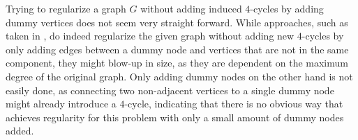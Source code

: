 \documentclass[a4paper,UKenglish,cleveref, autoref, thm-restate,numberwithinsect]{lipics-v2021}
\begin{document}
Trying to regularize a graph $G$ without adding induced $4$-cycles by adding dummy vertices does not seem very straight forward.
While approaches, such as taken in \cite{Cai08}, do indeed regularize the given graph without adding new $4$-cycles by only adding edges between a dummy node and vertices that are not in the same component,
they might blow-up in size, as they are dependent on the maximum degree of the original graph.
Only adding dummy nodes on the other hand is not easily done, as connecting two non-adjacent vertices to a single dummy node might already introduce a $4$-cycle,
indicating that there is no obvious way that achieves regularity for this problem with only a small amount of dummy nodes added.


\end{document}
